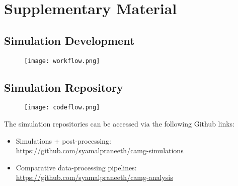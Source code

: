 \chapter{Supplementary Material} \label{c:supple}
\section{Simulation Development} \label{s:devel}
\begin{figure}[!h]
	\centering
	\texttt{[image: workflow.png]}
	\label{f:workflow}
\end{figure}

\clearpage
\section{Simulation Repository} \label{s:github}
\begin{figure}[!h] \centering
	\texttt{[image: codeflow.png]}
\end{figure}

The simulation repositories can be accessed via the following Github links:
\begin{itemize}[noitemsep]
	\item Simulations + post-processing:\\ \url{https://github.com/syamalpraneeth/camg-simulations}
	\item Comparative data-processing pipelines:\\ \url{https://github.com/syamalpraneeth/camg-analysis}
\end{itemize}

\clearpage
